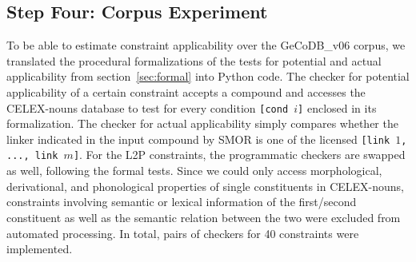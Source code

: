 \documentclass[10pt, a4paper]{article}
\begin{document}
\subsection{Step Four: Corpus Experiment}
\label{sec:exp}

To be able to estimate constraint applicability over the GeCoDB\_v06 corpus, we translated the procedural formalizations of the tests for potential and actual applicability from section~\ref{sec:formal} into Python code. The checker for potential applicability of a certain constraint accepts a compound and accesses the CELEX-nouns database to test for every condition \mbox{\texttt{[cond $i$]}} enclosed in its formalization. The checker for actual applicability simply compares whether the linker indicated in the input compound by SMOR is one of the licensed \mbox{\texttt{[link $1$, ..., link $m$]}}. For the L2P constraints, the programmatic checkers are swapped as well, following the formal tests. Since we could only access morphological, derivational, and phonological properties of single constituents in CELEX-nouns, constraints involving semantic or lexical information of the first/second constituent as well as the semantic relation between the two were excluded from automated processing. In total, pairs of checkers for 40 constraints were implemented.







\end{document}
